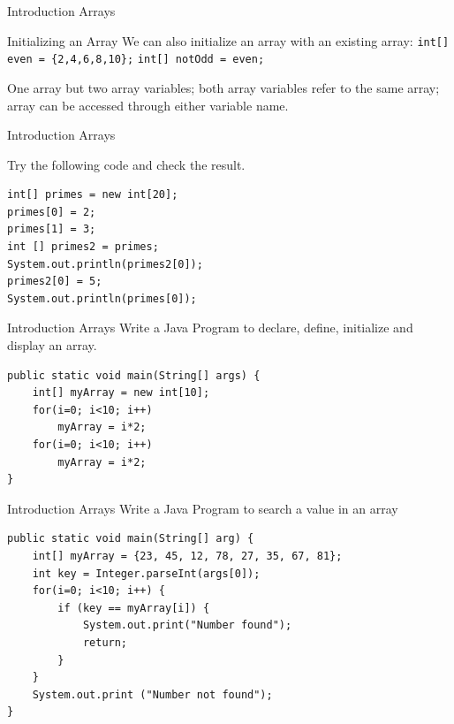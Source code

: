 \documentclass[14pt]{beamer}
\begin{document}
\begin{frame}[fragile]{Introduction Arrays}
\begin{block}{Initializing an Array}
We can also initialize an array with an existing array:
    \lstinline!int[] even = {2,4,6,8,10};!
    \lstinline!int[] notOdd = even;!
\end{block}
One array but two array variables; both array variables refer to the same array; array can be accessed through either variable name.
\end{frame}

\begin{frame}[fragile]{Introduction Arrays}
\begin{block}{Try the following code and check the result.}
\begin{lstlisting}[numbers=none]
int[] primes = new int[20];    
primes[0] = 2;                   
primes[1] = 3;                   
int [] primes2 = primes;
System.out.println(primes2[0]);
primes2[0] = 5;
System.out.println(primes[0]);
\end{lstlisting}
\end{block}
\end{frame}

\begin{frame}[fragile]{Introduction Arrays}
Write a Java Program to declare, define, initialize and display an array.
\begin{lstlisting}[numbers=none]
public static void main(String[] args) {
    int[] myArray = new int[10];
    for(i=0; i<10; i++)
        myArray = i*2;
    for(i=0; i<10; i++)
        myArray = i*2;
}
\end{lstlisting}
\end{frame}

\begin{frame}[fragile]{Introduction Arrays}
Write a Java Program to search a value in an array 
\begin{lstlisting}[numbers=none]
public static void main(String[] arg) {
    int[] myArray = {23, 45, 12, 78, 27, 35, 67, 81};
    int key = Integer.parseInt(args[0]);
    for(i=0; i<10; i++) {
        if (key == myArray[i]) {
            System.out.print("Number found");
            return;
        }
    }
    System.out.print ("Number not found"); 		
}
\end{lstlisting}
\end{frame}
\end{document}
